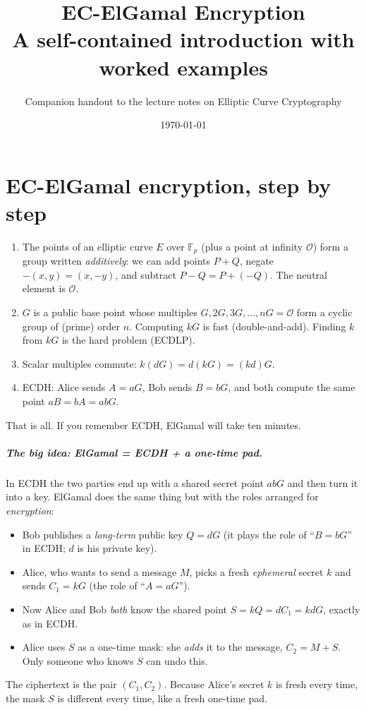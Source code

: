 \documentclass[11pt,a4paper,oneside]{book}
\title{\Huge\bfseries EC-ElGamal Encryption\\[0.3cm]\Large A self-contained introduction with worked examples}
\author{\large Companion handout to the lecture notes on Elliptic Curve Cryptography}
\date{\today}
\theoremstyle{plain}
\theoremstyle{definition}
\theoremstyle{remark}
\newcommand{\F}{\mathbb{F}}
\newcommand{\Oinf}{\mathcal{O}}
\newcommand{\ELsection}{\chapter}
\begin{document}
\maketitle
\mainmatter
\ELsection{EC-ElGamal encryption, step by step}\label{sec:ecelgamal}

\begin{keyidea}
\begin{enumerate}[nosep]
\item The points of an elliptic curve $E$ over $\F_p$ (plus a point at infinity $\Oinf$) form a group written \emph{additively}: we can add points $P+Q$, negate $-(x,y)=(x,-y)$, and subtract $P-Q=P+(-Q)$. The neutral element is $\Oinf$.
\item $G$ is a public base point whose multiples $G,2G,3G,\dots,nG=\Oinf$ form a cyclic group of (prime) order $n$. Computing $kG$ is fast (double-and-add). Finding $k$ from $kG$ is the hard problem (ECDLP).
\item Scalar multiples commute: $k(dG)=d(kG)=(kd)G$.
\item ECDH: Alice sends $A=aG$, Bob sends $B=bG$, and both compute the same point $aB=bA=abG$.
\end{enumerate}
That is all. If you remember ECDH, ElGamal will take ten minutes.
\end{keyidea}

\paragraph{The big idea: ElGamal = ECDH + a one-time pad.}
In ECDH the two parties end up with a shared secret point $abG$ and then turn it into a key. ElGamal does the same thing but with the roles arranged for \emph{encryption}:
\begin{itemize}[nosep]
\item Bob publishes a \emph{long-term} public key $Q=dG$ (it plays the role of ``$B=bG$'' in ECDH; $d$ is his private key).
\item Alice, who wants to send a message $M$, picks a fresh \emph{ephemeral} secret $k$ and sends $C_1=kG$ (the role of ``$A=aG$'').
\item Now Alice and Bob \emph{both} know the shared point $S=kQ=dC_1=kdG$, exactly as in ECDH.
\item Alice uses $S$ as a one-time mask: she \emph{adds} it to the message, $C_2=M+S$. Only someone who knows $S$ can undo this.
\end{itemize}
The ciphertext is the pair $(C_1,C_2)$. Because Alice's secret $k$ is fresh every time, the mask $S$ is different every time, like a fresh one-time pad.
\end{document}
